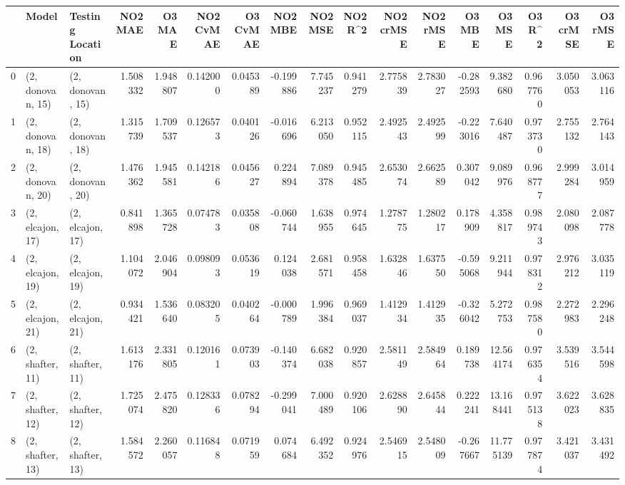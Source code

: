 \begin{tabular}{lllrrrrrrrrrrrrrr}
\toprule
{} &             Model &  Testing Location &   NO2 MAE &    O3 MAE &  NO2 CvMAE &  O3 CvMAE &   NO2 MBE &    NO2 MSE &   NO2 R\textasciicircum2 &  NO2 crMSE &  NO2 rMSE &    O3 MBE &     O3 MSE &    O3 R\textasciicircum2 &  O3 crMSE &   O3 rMSE \\
\midrule
0  &  (2, donovan, 15) &  (2, donovan, 15) &  1.508332 &  1.948807 &   0.142000 &  0.045389 & -0.199886 &   7.745237 &  0.941279 &   2.775839 &  2.783027 & -0.282593 &   9.382680 &  0.967760 &  3.050053 &  3.063116 \\
1  &  (2, donovan, 18) &  (2, donovan, 18) &  1.315739 &  1.709537 &   0.126573 &  0.040126 & -0.016696 &   6.213050 &  0.952115 &   2.492543 &  2.492599 & -0.223016 &   7.640487 &  0.973730 &  2.755132 &  2.764143 \\
2  &  (2, donovan, 20) &  (2, donovan, 20) &  1.476362 &  1.945581 &   0.142186 &  0.045627 &  0.224894 &   7.089378 &  0.945485 &   2.653074 &  2.662589 &  0.307042 &   9.089976 &  0.968777 &  2.999284 &  3.014959 \\
3  &  (2, elcajon, 17) &  (2, elcajon, 17) &  0.841898 &  1.365728 &   0.074783 &  0.035808 & -0.060744 &   1.638955 &  0.974645 &   1.278775 &  1.280217 &  0.178909 &   4.358817 &  0.989743 &  2.080098 &  2.087778 \\
4  &  (2, elcajon, 19) &  (2, elcajon, 19) &  1.104072 &  2.046904 &   0.098093 &  0.053619 &  0.124038 &   2.681571 &  0.958458 &   1.632846 &  1.637550 & -0.595068 &   9.211944 &  0.978312 &  2.976212 &  3.035119 \\
5  &  (2, elcajon, 21) &  (2, elcajon, 21) &  0.934421 &  1.536640 &   0.083205 &  0.040264 & -0.000789 &   1.996384 &  0.969037 &   1.412934 &  1.412935 & -0.326042 &   5.272753 &  0.987580 &  2.272983 &  2.296248 \\
6  &  (2, shafter, 11) &  (2, shafter, 11) &  1.613176 &  2.331805 &   0.120161 &  0.073903 & -0.140374 &   6.682038 &  0.920857 &   2.581149 &  2.584964 &  0.189738 &  12.564174 &  0.976354 &  3.539516 &  3.544598 \\
7  &  (2, shafter, 12) &  (2, shafter, 12) &  1.725074 &  2.475820 &   0.128336 &  0.078294 & -0.299041 &   7.000489 &  0.920106 &   2.628890 &  2.645844 &  0.222241 &  13.168441 &  0.975138 &  3.622023 &  3.628835 \\
8  &  (2, shafter, 13) &  (2, shafter, 13) &  1.584572 &  2.260057 &   0.116848 &  0.071959 &  0.074684 &   6.492352 &  0.924976 &   2.546915 &  2.548009 & -0.267667 &  11.775139 &  0.977874 &  3.421037 &  3.431492 \\

\end{tabular}
